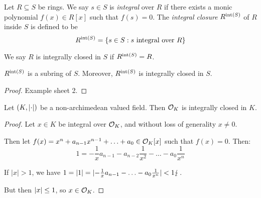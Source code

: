 \documentclass[10pt,a4paper]{article}
\begin{document}
\begin{definition}
  Let $R \subseteq S$ be rings. We say $s \in S$ is \emph{integral} over $R$ if there exists a monic polynomial $f(x) \in R[x]$ such that $f(s) = 0$. The \emph{integral closure} $R^{\operatorname{int}(S)}$ of $R$ inside $S$ is defined to be
  \[ R^{\operatorname{int}(S)} = \{s \in S : s \text{ integral over }R\}\]

  We say $R$ is integrally closed in $S$ if $R^{\operatorname{int}(S)} = R$.
\end{definition}
\begin{proposition}
  $R^{\operatorname{int}(S)}$ is a subring of $S$. Moreover, $R^{\operatorname{int}(S)}$ is integrally closed in $S$.
\end{proposition}
\begin{proof}
  Example sheet 2.
\end{proof}
\begin{lemma}
  Let $(K, \lvert\cdot\rvert)$ be a non-archimedean valued field. Then $\mathcal{O}_K$ is integrally closed in $K$.
\end{lemma}
\begin{proof}
  Let $x \in K$ be integral over $\mathcal{O}_K$, and without loss of generality $x \neq 0$.

  Then let $f(x) = x^n+a_{n-1}x^{n-1} + \ldots + a_0 \in \mathcal{O}_K[x]$ such that $f(x) = 0$. Then:
  \[ 1 = -\frac{1}{x}a_{n-1} - a_{n-2} \frac{1}{x^2}-\ldots - a_0\frac{1}{x^n}\]

  If $|x|>1$, we have $1 = \lvert1\rvert = \lvert-\frac{1}{x}a_{n-1}-\ldots-a_0\frac{1}{x^n}\rvert < 1 \lightning$.

  But then $\lvert x\rvert \leq 1$, so $x \in \mathcal{O}_K$.
\end{proof}
\end{document}
